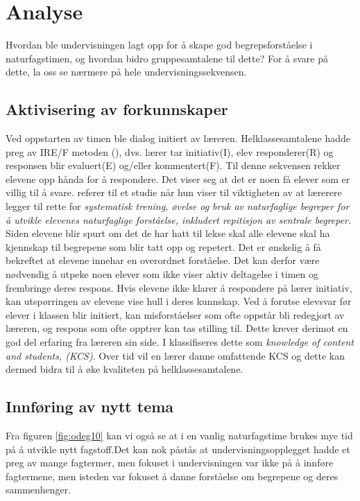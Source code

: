 \documentclass[main.tex]{subfiles}
\begin{document}
\section*{Analyse}
\label{sec:2}

Hvordan ble undervisningen lagt opp for å skape god begrepsforståelse i naturfagstimen, og hvordan 
bidro gruppesamtalene til dette? For å svare på dette, la oss se nærmere på hele 
undervisningssekvensen.
\newline
\newline
\subsection*{Aktivisering av forkunnskaper}
Ved oppstarten av timen ble dialog initiert av læreren. Helklassesamtalene hadde preg av
IRE/F metoden (), dvs. lærer tar initiativ(I), elev responderer(R) og responsen blir 
evaluert(E) og/eller kommentert(F). Til denne sekvensen rekker elevene opp hånda for å respondere. 
Det viser seg at det er noen få elever som er villig til å svare.  referer til 
et studie når hun viser til viktigheten av at lærerere legger til rette for \emph{systematisk 
trening, øvelse og bruk av naturfaglige begreper for å utvikle elevenes naturfaglige forståelse, 
inkludert repitisjon av sentrale begreper.}
\newline
\newline
Siden elevene blir spurt om det de har hatt til lekse skal alle elevene skal ha kjennskap til 
begrepene som blir tatt opp og repetert. Det er ønskelig å få bekreftet at elevene innehar en 
overordnet forståelse. Det kan derfor være nødvendig å utpeke noen elever som ikke viser aktiv 
deltagelse i timen og frembringe deres respons. Hvis elevene ikke klarer å respondere på lærer 
initiativ, kan utspørringen av elevene vise hull i deres kunnskap. 
\newline
\newline
Ved å forutse elevsvar før elever i klassen blir initiert, kan misforståelser som 
ofte oppstår bli redegjort av læreren, og respons som ofte opptrer kan tas stilling til. Dette krever 
derimot en god del erfaring fra læreren sin side. I  klassifiseres dette som 
\emph{knowledge of content and students, (KCS)}. Over tid vil en lærer danne omfattende KCS og dette 
kan dermed bidra til å øke kvaliteten på helklassesamtalene. 

\subsection*{Innføring av nytt tema}
Fra figuren \ref{fig:odeg10} kan vi også se at i en vanlig naturfagstime brukes mye tid på å utvikle 
nytt fagstoff.Det kan nok påstås at undervisningsopplegget hadde et preg av mange fagtermer, men 
fokuset i undervisningen var ikke på å innføre fagtermene, men isteden var fokuset å danne forståelse 
om begrepene og deres sammenhenger. 
\end{document}
